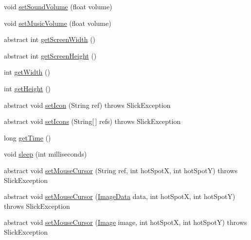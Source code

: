 \begin{DoxyCompactItemize}
void \mbox{\hyperlink{classorg_1_1newdawn_1_1slick_1_1_game_container_aa023e8d1edafe3d1a57a04d32e85dc9f}{set\+Sound\+Volume}} (float volume)
\item 
void \mbox{\hyperlink{classorg_1_1newdawn_1_1slick_1_1_game_container_aec3a92df093fecdc3093b38c7b57b0bf}{set\+Music\+Volume}} (float volume)
\item 
abstract int \mbox{\hyperlink{classorg_1_1newdawn_1_1slick_1_1_game_container_a4c84d852e74fa2eb0d1e05f924f5402b}{get\+Screen\+Width}} ()
\item 
abstract int \mbox{\hyperlink{classorg_1_1newdawn_1_1slick_1_1_game_container_afdb008e76bcbc6de23e783670c044f28}{get\+Screen\+Height}} ()
\item 
int \mbox{\hyperlink{classorg_1_1newdawn_1_1slick_1_1_game_container_a938fe1a28567182445e60450915d5f69}{get\+Width}} ()
\item 
int \mbox{\hyperlink{classorg_1_1newdawn_1_1slick_1_1_game_container_a7eff88473fe5715fdfc2f92e8cb48521}{get\+Height}} ()
\item 
abstract void \mbox{\hyperlink{classorg_1_1newdawn_1_1slick_1_1_game_container_a094c28e0d9f9827b10ddcd68267c65c3}{set\+Icon}} (String ref)  throws Slick\+Exception
\item 
abstract void \mbox{\hyperlink{classorg_1_1newdawn_1_1slick_1_1_game_container_a9be825e4e0980618340296e9cbbededf}{set\+Icons}} (String\mbox{[}$\,$\mbox{]} refs)  throws Slick\+Exception
\item 
long \mbox{\hyperlink{classorg_1_1newdawn_1_1slick_1_1_game_container_a1650b161216693ec0b4c0d9d00496c05}{get\+Time}} ()
\item 
void \mbox{\hyperlink{classorg_1_1newdawn_1_1slick_1_1_game_container_ae52a0a34f747d41704fb1353c3d4447b}{sleep}} (int milliseconds)
\item 
abstract void \mbox{\hyperlink{classorg_1_1newdawn_1_1slick_1_1_game_container_a13e789e67755f14bad1caf70e3bd6d4e}{set\+Mouse\+Cursor}} (String ref, int hot\+SpotX, int hot\+SpotY)  throws Slick\+Exception
\item 
abstract void \mbox{\hyperlink{classorg_1_1newdawn_1_1slick_1_1_game_container_aaa719c4c6927fe7c314b86eb1db68c66}{set\+Mouse\+Cursor}} (\mbox{\hyperlink{interfaceorg_1_1newdawn_1_1slick_1_1opengl_1_1_image_data}{Image\+Data}} data, int hot\+SpotX, int hot\+SpotY)  throws Slick\+Exception
\item 
abstract void \mbox{\hyperlink{classorg_1_1newdawn_1_1slick_1_1_game_container_a735687e6f8e638a1724c3f2706432093}{set\+Mouse\+Cursor}} (\mbox{\hyperlink{classorg_1_1newdawn_1_1slick_1_1_image}{Image}} image, int hot\+SpotX, int hot\+SpotY)  throws Slick\+Exception

\end{DoxyCompactItemize}
